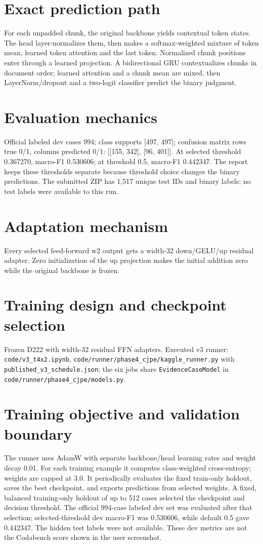 \documentclass[11pt,a4paper]{article}
\begin{document}
\section{Exact prediction path}
For each unpadded chunk, the original backbone yields contextual token states. The head layer-normalizes them, then makes a softmax-weighted mixture of token mean, learned token attention and the last token. Normalized chunk positions enter through a learned projection. A bidirectional GRU contextualizes chunks in document order; learned attention and a chunk mean are mixed, then LayerNorm/dropout and a two-logit classifier predict the binary judgment.
\section{Evaluation mechanics}
Official labeled dev cases 994; class supports [497, 497]; confusion matrix rows true 0/1, columns predicted 0/1: [[155, 342], [96, 401]]. At selected threshold 0.367270, macro-F1 0.530606; at threshold 0.5, macro-F1 0.442347. The report keeps these thresholds separate because threshold choice changes the binary predictions. The submitted ZIP has 1,517 unique test IDs and binary labels; no test labels were available to this run.
\section{Adaptation mechanism}
Every selected feed-forward w2 output gets a width-32 down/GELU/up residual adapter. Zero initialization of the up projection makes the initial addition zero while the original backbone is frozen.
\section{Training design and checkpoint selection}
Frozen D222 with width-32 residual FFN adapters. Executed v3 runner: \texttt{code/v3\_t4x2.ipynb}, \texttt{code/runner/phase4\_cjpe/kaggle\_runner.py} with \texttt{published\_v3\_schedule.json}; the six jobs share \texttt{EvidenceCaseModel} in \texttt{code/runner/phase4\_cjpe/models.py}.
\section{Training objective and validation boundary}
The runner uses AdamW with separate backbone/head learning rates and weight decay 0.01. For each training example it computes class-weighted cross-entropy; weights are capped at 3.0. It periodically evaluates the fixed train-only holdout, saves the best checkpoint, and exports predictions from selected weights. A fixed, balanced training-only holdout of up to 512 cases selected the checkpoint and decision threshold. The official 994-case labeled dev set was evaluated after that selection; selected-threshold dev macro-F1 was 0.530606, while default 0.5 gave 0.442347. The hidden test labels were not available. These dev metrics are not the Codabench score shown in the user screenshot.
\end{document}
